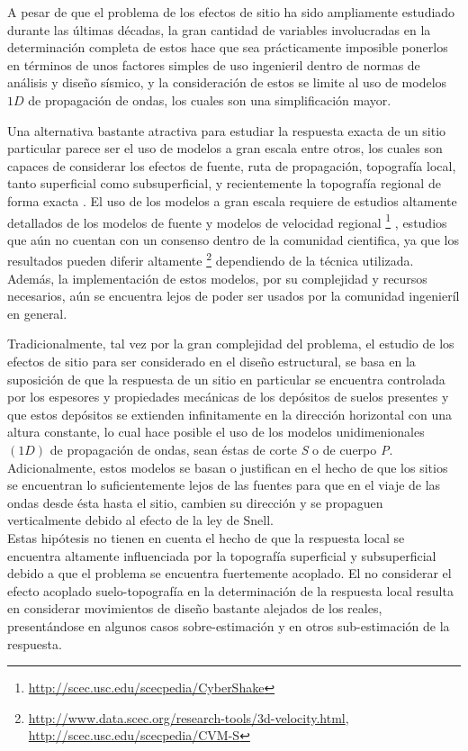 \documentclass[spanish,letterpaper,12pt,twoside,openany]{article}
\begin{document}
A pesar de que el problema de los efectos de sitio ha sido ampliamente estudiado durante las últimas décadas, la gran cantidad de variables involucradas en la determinación completa de estos hace que sea prácticamente imposible ponerlos en términos de unos factores simples de uso ingenieril dentro de normas de análisis y diseño sísmico, y la consideración de estos se limite al uso de modelos $1D$ de propagación de ondas, los cuales son una simplificación mayor.

Una alternativa bastante atractiva para estudiar la respuesta exacta de un sitio particular parece ser el uso de modelos a gran escala \citep[por ejemplo][]{Bielak2005, Lee2009a, Lee2009b, Ma2007, Cupillard2012} entre otros, los cuales son capaces de considerar los efectos de fuente, ruta de propagación, topografía local, tanto superficial como subsuperficial, y recientemente la topografía regional de forma exacta \citep{Doriam2014}. El uso de los modelos a gran escala requiere de estudios altamente detallados de los modelos de fuente y modelos de velocidad regional \footnote{\url{http://scec.usc.edu/scecpedia/CyberShake}}  \citep{Graves2011}, estudios que aún no cuentan con un consenso dentro de la comunidad cientifica, ya que los resultados pueden diferir altamente \footnote{\url{http://www.data.scec.org/research-tools/3d-velocity.html},\\	 \url{http://scec.usc.edu/scecpedia/CVM-S}} dependiendo de la técnica utilizada. Además, la implementación de estos modelos, por su complejidad y recursos necesarios, aún se encuentra lejos de poder ser usados por la comunidad ingenieríl en general.
%

Tradicionalmente, tal vez por la gran complejidad del problema, el estudio de los efectos de sitio para ser considerado en el diseño estructural, se basa en la suposición de que la respuesta de un sitio en particular se encuentra controlada por los espesores y propiedades mecánicas de los depósitos de suelos presentes y que estos depósitos se extienden infinitamente en la dirección horizontal con una altura constante, lo cual hace posible el uso de los modelos unidimenionales $\left( 1D \right)$ de propagación de ondas, sean éstas de corte \textit{S} o de cuerpo \textit{P}. Adicionalmente, estos modelos se basan o justifican en el hecho de que los sitios se encuentran lo suficientemente lejos de las fuentes para que en el viaje de las ondas desde ésta hasta el sitio, cambien su dirección y se propaguen verticalmente debido al efecto de la ley de Snell.\\
%
Estas hipótesis no tienen en cuenta el hecho de que la respuesta local se encuentra altamente influenciada por la topografía superficial y subsuperficial debido a que el problema se encuentra fuertemente acoplado. El no considerar el efecto acoplado suelo-topografía en la determinación de la respuesta local resulta en considerar movimientos de diseño bastante alejados de los reales, presentándose en algunos casos sobre-estimación y en otros sub-estimación de la respuesta.
\end{document}
